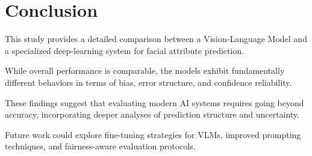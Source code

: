 \documentclass[a4paper,11pt,twocolumn]{article}
\begin{document}
\section{Conclusion}

This study provides a detailed comparison between a Vision-Language Model and a specialized deep-learning system for facial attribute prediction.

While overall performance is comparable, the models exhibit fundamentally different behaviors in terms of bias, error structure, and confidence reliability.

These findings suggest that evaluating modern AI systems requires going beyond accuracy, incorporating deeper analyses of prediction structure and uncertainty.

Future work could explore fine-tuning strategies for VLMs, improved prompting techniques, and fairness-aware evaluation protocols.


\end{document}
